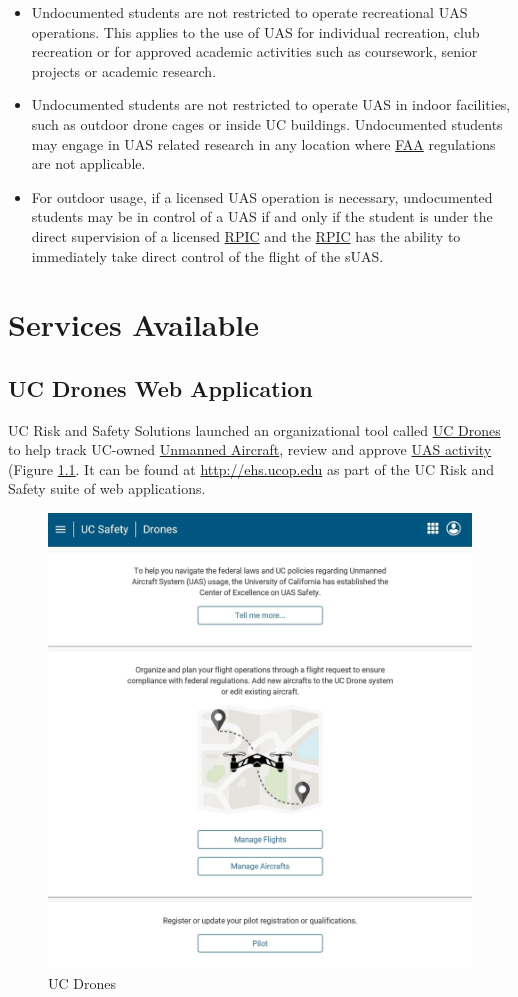 \documentclass[
]{book}
\providecommand{\tightlist}{%
  \setlength{\itemsep}{0pt}\setlength{\parskip}{0pt}}
\begin{document}
\begin{itemize}
\tightlist
\item
  Undocumented students are not restricted to operate recreational UAS operations. This applies to the use of UAS for individual recreation, club recreation or for approved academic activities such as coursework, senior projects or academic research.
\item
  Undocumented students are not restricted to operate UAS in indoor facilities, such as outdoor drone cages or inside UC buildings. Undocumented students may engage in UAS related research in any location where \protect\hyperlink{FAA}{FAA} regulations are not applicable.
\item
  For outdoor usage, if a licensed UAS operation is necessary, undocumented students may be in control of a UAS if and only if the student is under the direct supervision of a licensed \protect\hyperlink{RPIC}{RPIC} and the \protect\hyperlink{RPIC}{RPIC} has the ability to immediately take direct control of the flight of the sUAS.
\end{itemize}

\hypertarget{ch-services}{%
\chapter{Services Available}\label{ch-services}}

\hypertarget{sec-UCDrones}{%
\section{UC Drones Web Application}\label{sec-UCDrones}}

UC Risk and Safety Solutions launched an organizational tool called \protect\hyperlink{UCDrones}{UC Drones} to help track UC-owned \protect\hyperlink{UA}{Unmanned Aircraft}, review and approve \protect\hyperlink{UASactivity}{UAS activity} (Figure \ref{fig:UCDrones}. It can be found at \url{http://ehs.ucop.edu} as part of the UC Risk and Safety suite of web applications.

\begin{figure}

{\centering \includegraphics[width=0.6\linewidth]{images/UCDrones} 

}

\caption{UC Drones}\label{fig:UCDrones}
\end{figure}
\end{document}

